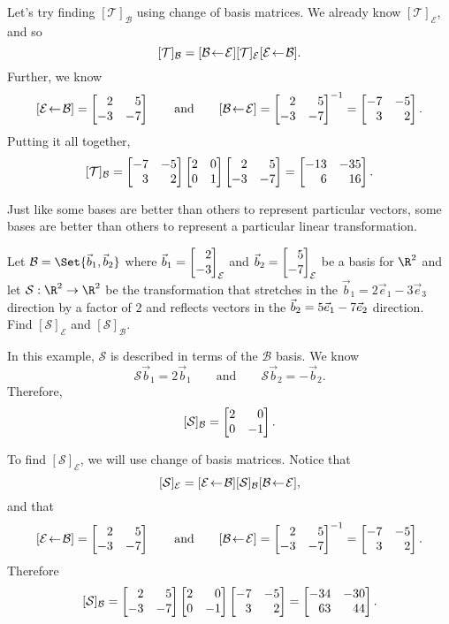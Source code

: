 \begin{example}
	Let's try finding $[\mathcal T]_{\mathcal B}$ using change of basis matrices. We already know $[\mathcal T]_{\mathcal E}$, and so
	\[
		[\mathcal T]_{\mathcal B} = \BasisChange{\mathcal E}{\mathcal B}[\mathcal T]_{\mathcal E}\BasisChange{\mathcal B}{\mathcal E}.
	\]
	Further, we know
	\[
		\BasisChange{\mathcal B}{\mathcal E}=\mat{2&5\\-3&-7}\qquad \text{and}\qquad
		\BasisChange{\mathcal E}{\mathcal B}=\mat{2&5\\-3&-7}^{-1}=\mat{-7&-5\\3&2}.
	\]
	Putting it all together,
	\[
		[\mathcal T]_{\mathcal B}=\mat{-7&-5\\3&2}\mat{2&0\\0&1}\mat{2&5\\-3&-7} = \mat{-13&-35\\6&16}.
	\]

\end{example}


Just like some bases are better than others to represent particular vectors, some bases are better than others
to represent a particular linear transformation.

\begin{example}
	Let $\mathcal B=\Set{\vec b_1,\vec b_2}$ where $\vec b_1=\mat{2\\-3}_{\mathcal E}$ and $\vec b_2=\mat{5\\-7}_{\mathcal E}$
	be a basis for $\R^2$ and let $\mathcal S:\R^2\to\R^2$ be the transformation that stretches in the $\vec b_1=2\vec e_1-3\vec e_3$ direction 
	by a factor of $2$ and reflects vectors in the $\vec b_2=5\xhat-7\yhat$ direction. 
	Find $[\mathcal S]_{\mathcal E}$ and $[\mathcal S]_{\mathcal B}$.

	In this example, $\mathcal S$ is described in terms of the $\mathcal B$ basis. We know
	\[
		\mathcal S\vec b_1=2\vec b_1\qquad\text{and}\qquad\mathcal S\vec b_2=-\vec b_2.
	\]
	Therefore,
	\[
		[\mathcal S]_{\mathcal B}=\mat{2&0\\0&-1}.
	\]

	To find $[\mathcal S]_{\mathcal E}$, we will use change of basis matrices. Notice that
	\[
		[\mathcal S]_{\mathcal E} = \BasisChange{\mathcal B}{\mathcal E}[\mathcal S]_{\mathcal B}\BasisChange{\mathcal E}{\mathcal B},
	\]
	and that
	\[
		\BasisChange{\mathcal B}{\mathcal E}=\mat{2&5\\-3&-7}\qquad \text{and}\qquad
		\BasisChange{\mathcal E}{\mathcal B}=\mat{2&5\\-3&-7}^{-1}=\mat{-7&-5\\3&2}.
	\]
	Therefore
	\[
		[\mathcal S]_{\mathcal B} = \mat{2&5\\-3&-7}\mat{2&0\\0&-1}\mat{-7&-5\\3&2}=\mat{-34&-30\\63&44}.
	\]
\end{example}

